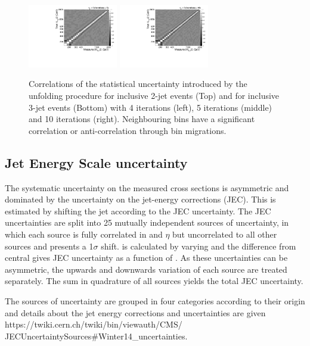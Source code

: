 \begin{figure}[h]
\begin{center}
    \includegraphics[width=0.35\textwidth]{Plots_HT_2_150/Correlation_Matrix_NLO_3_ite5.pdf}%
    \includegraphics[width=0.35\textwidth]{Plots_HT_2_150/Correlation_Matrix_NLO_3_ite10.pdf}%
    \caption{Correlations of the statistical uncertainty introduced by the unfolding procedure for inclusive 2-jet events (Top) and for 
      inclusive 3-jet events (Bottom) with 4 iterations (left), 5 iterations (middle) and 10 iterations (right). Neighbouring bins have a 
      significant correlation or anti-correlation through bin migrations.}
    \label{fig:corr}
  \end{center}
\end{figure}

\subsection{Jet Energy Scale uncertainty}
The systematic uncertainty on the measured cross sections is asymmetric and dominated by the uncertainty on the jet-energy corrections (JEC). This is estimated by shifting the jet \pt according to the JEC uncertainty. The JEC uncertainties are split 
into 25 mutually independent sources of uncertainty, in which each source is fully correlated in \pt and $\eta$ but uncorrelated to all 
other sources and presents a 1$\sigma$ shift. \httwo is calculated by varying \pt and the difference from central \httwo gives JEC uncertainty as a function of \httwo. As these uncertainties can be asymmetric, the upwards and downwards variation of each source 
are treated separately. The sum in quadrature of all sources yields the total JEC uncertainty.

The sources of uncertainty are grouped in four categories according to their origin and details about the jet energy corrections and 
uncertainties are given %
https://twiki.cern.ch/twiki/bin/viewauth/CMS/ JECUncertaintySources\#Winter14\_uncertainties. 

